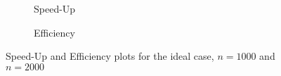\documentclass[a4paper]{article}
\begin{document}
    \begin{figure}[htp!]
      \centering
      \begin{subfigure}{.5\textwidth}
        \centering
        \caption{Speed-Up}
        \label{fig:SpeedUp}
      \end{subfigure}%
      \begin{subfigure}{.5\textwidth}
        \centering
        \caption{Efficiency}
        \label{fig:Efficiency}
      \end{subfigure}
      \caption{Speed-Up and Efficiency plots for the ideal case, $n=1000$ and $n = 2000$}
    \end{figure}
\end{document}
